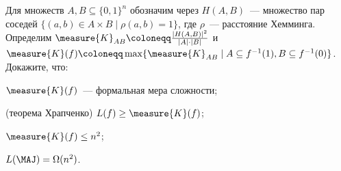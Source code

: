 Для множеств $A, B \subseteq \{0, 1\}^n$ обозначим через $H(A, B)$~--- множество пар соседей $\{(a, b)
\in A \times B \mid \rho(a, b) = 1\}$, где $\rho$~--- расстояние Хемминга. Определим $\measure{K}_{AB}
\coloneqq \frac{|H(A, B)|^2}{|A| \cdot |B|}$ и $\measure{K}(f) \coloneqq \max \{\measure{K}_{AB} \mid A
\subseteq f^{-1}(1), B \subseteq f^{-1}(0)\}$. Докажите, что:
\begin{enumcyr}
    \item $\measure{K}(f)$~--- формальная мера сложности;
    \item (теорема Храпченко) $L(f) \ge \measure{K}(f)$;
    \item $\measure{K}(f) \le n^2$;
    \item $L(\MAJ) = \Omega(n^2)$.
\end{enumcyr}